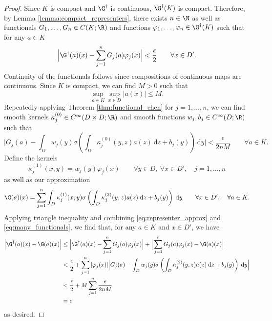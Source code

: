 \begin{proof}
Since \(K\) is compact and \(\G^\dagger\) is continuous, \(\G^\dagger (K)\) is compact. Therefore, by Lemma \ref{lemma:compact_representers}, there exists \(n \in \N\) as well as 
functionals \(G_1,\dots,G_n \in C(K;\R)\) and functions \(\varphi_1,\dots,\varphi_n \in \G^\dagger (K)\) such that
for any \(a \in K\)
\begin{equation}
\label{eq:representer_approx}
\Big|\G^\dagger (a)(x) - \sum_{j=1}^n G_j( a ) \varphi_j(x)\Big| < \frac{\epsilon}{2} \qquad \forall x \in D'. 
\end{equation}
Continuity of the functionals follows since compositions of continuous maps are continuous. Since \(K\) is compact, we can find \(M > 0\) such that
\[\sup_{a \in K} \sup_{x \in D} |a(x)| \leq M.\]
Repeatedly applying Theorem \ref{thm:functional_chen} for \(j=1,\dots,n\), we can find 
smooth kernels \(\kappa^{(0)}_j \in C^\infty(D \times D;\R)\) and smooth functions \(w_j, b_j \in C^\infty(D;\R)\)
such that
\begin{equation}
\label{eq:many_functionals}
\Big|G_j(a) - \int_D w_j (y) \sigma \left ( \int_D \kappa_j^{(0)} (y,z) a(z) \: \text{d}z + b_j(y) \right ) \: \text{d}y \Big| < \frac{\epsilon}{2nM} \qquad \forall a \in K.
\end{equation}
Define the kernels 
\[\kappa^{(1)}_j (x,y) = w_j(y) \varphi_j(x) \qquad \forall y \in D, \: \forall x \in D', \quad j=1,\dots,n\]
as well as our approximation 
\[\G(a)(x) = \sum_{j=1}^n \int_D \kappa^{(1)}_j(x, y) \sigma \left ( \int_D \kappa^{(2)}_j (y,z) a(z) \: \text{d}z + b_j(y) \right ) \: \text{d}y \qquad \forall x \in D', \quad \forall a \in K.\]
Applying triangle inequality and combining \eqref{eq:representer_approx} and \eqref{eq:many_functionals}, we find
that, for any \(a \in K\) and \(x \in D'\), we have
\begin{align*}
\Big| \G^\dagger(a)(x) - \G(a)(x) \Big| &\leq \Big| \G^\dagger(a)(x) - \sum_{j=1}^n G_j(a) \varphi_j(x)\Big| + \Big|\sum_{j=1}^n G_j(a) \varphi_j(x) - \G(a)(x)\Big| \\
&< \frac{\epsilon}{2} + \sum_{j=1}^n | \varphi_j(x)| \Big|G_j(a) - \int_D w_j(y) \sigma \left ( \int_D \kappa_j^{(2)}(y,z) a(z) \: \text{d}z + b_j(y) \right ) \: \text{d}y\Big| \\
&< \frac{\epsilon}{2} +  M \sum_{j=1}^n \frac{\epsilon}{2nM} \\
&= \epsilon
\end{align*}
as desired.
\end{proof}

\fi









